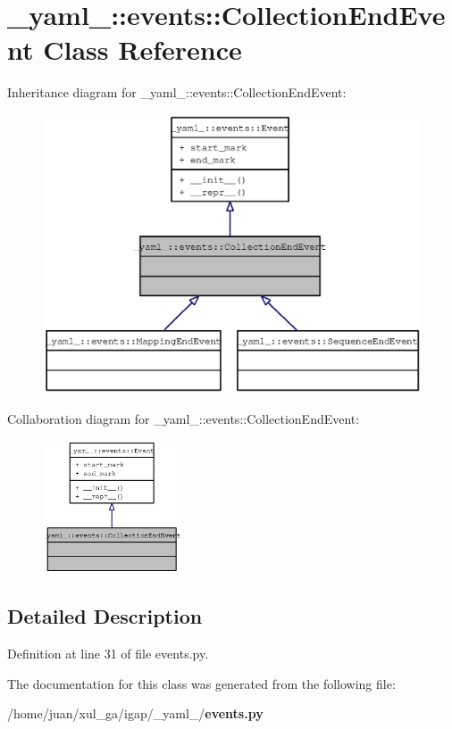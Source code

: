 \section{\_\-yaml\_\-::events::CollectionEndEvent Class Reference}
\label{class__yaml___1_1events_1_1CollectionEndEvent}
Inheritance diagram for \_\-yaml\_\-::events::CollectionEndEvent:\nopagebreak
\begin{figure}[H]
\begin{center}
\leavevmode
\includegraphics[width=400pt]{class__yaml___1_1events_1_1CollectionEndEvent__inherit__graph}
\end{center}
\end{figure}
Collaboration diagram for \_\-yaml\_\-::events::CollectionEndEvent:\nopagebreak
\begin{figure}[H]
\begin{center}
\leavevmode
\includegraphics[width=117pt]{class__yaml___1_1events_1_1CollectionEndEvent__coll__graph}
\end{center}
\end{figure}


\subsection{Detailed Description}


Definition at line 31 of file events.py.

The documentation for this class was generated from the following file:\begin{CompactItemize}
\item 
/home/juan/xul\_\-ga/igap/\_\-yaml\_\-/{\bf events.py}\end{CompactItemize}
